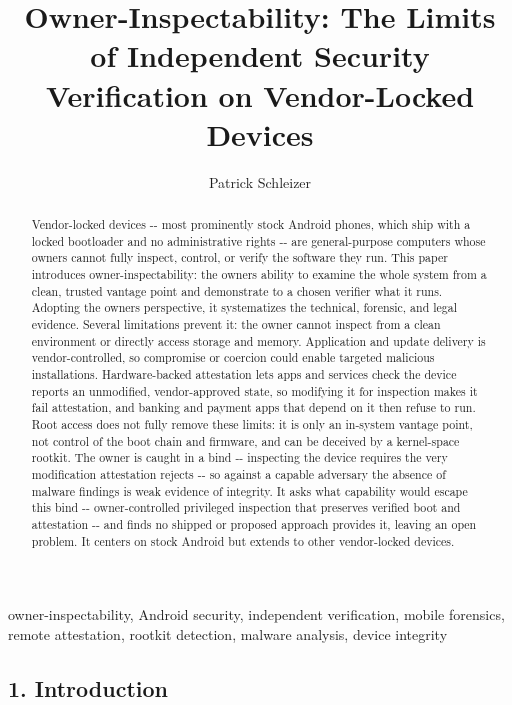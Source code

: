 \documentclass[
  journal]{IEEEtran}
\author{}
\date{}
\title{Owner-Inspectability: The Limits of Independent Security Verification on
Vendor-Locked Devices}
\author{Patrick Schleizer}
\begin{document}
\maketitle
\begin{abstract}
Vendor-locked devices -\/- most prominently stock Android phones, which
ship with a locked bootloader and no administrative rights -\/- are
general-purpose computers whose owners cannot fully inspect, control, or
verify the software they run. This paper introduces
owner-inspectability: the owner\textquotesingle s ability to examine the
whole system from a clean, trusted vantage point and demonstrate to a
chosen verifier what it runs. Adopting the owner\textquotesingle s
perspective, it systematizes the technical, forensic, and legal
evidence. Several limitations prevent it: the owner cannot inspect from
a clean environment or directly access storage and memory. Application
and update delivery is vendor-controlled, so compromise or coercion
could enable targeted malicious installations. Hardware-backed
attestation lets apps and services check the device reports an
unmodified, vendor-approved state, so modifying it for inspection makes
it fail attestation, and banking and payment apps that depend on it then
refuse to run. Root access does not fully remove these limits: it is
only an in-system vantage point, not control of the boot chain and
firmware, and can be deceived by a kernel-space rootkit. The owner is
caught in a bind -\/- inspecting the device requires the very
modification attestation rejects -\/- so against a capable adversary the
absence of malware findings is weak evidence of integrity. It asks what
capability would escape this bind -\/- owner-controlled privileged
inspection that preserves verified boot and attestation -\/- and finds
no shipped or proposed approach provides it, leaving an open problem. It
centers on stock Android but extends to other vendor-locked devices.
\end{abstract}
\begin{IEEEkeywords}
owner-inspectability, Android security, independent verification, mobile forensics, remote attestation, rootkit detection, malware analysis, device integrity
\end{IEEEkeywords}

\subsection{1. Introduction}\label{introduction}
\end{document}
